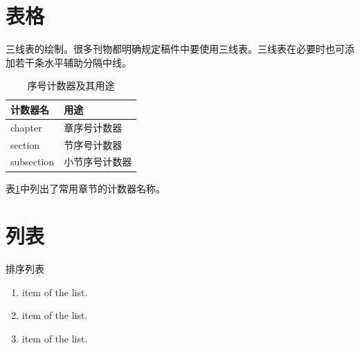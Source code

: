 \section{表格}
三线表的绘制。很多刊物都明确规定稿件中要使用三线表。三线表在必要时也可添加若干条水平辅助分隔中线。
\begin{table}[!h]
\centering
\caption{序号计数器及其用途\label{tab:2-1}}
\begin{tabular}{@{}ll@{}}
\toprule[1pt]
计数器名   & 用途            \\ \midrule
chapter    & 章序号计数器    \\
section    & 节序号计数器    \\
subsection & 小节序号计数器  \\
\bottomrule[1pt]
\end{tabular}
\end{table}

表\ref{tab:2-1}中列出了常用章节的计数器名称。

\section{列表}
排序列表
\begin{enumerate}
  \item item of the list.
  \item item of the list.
  \item item of the list.
\end{enumerate}


